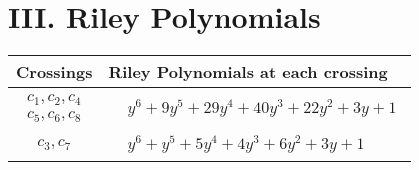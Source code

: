 \documentclass[1p]{elsarticle_modified}
\theoremstyle{definition}
\begin{document}
\centering \section*{ III. Riley Polynomials}
\begin{tabular}{m{50pt}|m{274pt}}
Crossings & \hspace{64pt}Riley Polynomials at each crossing \\
\hline $$\begin{aligned}c_{1},c_{2},c_{4}\\c_{5},c_{6},c_{8}\end{aligned}$$&$\begin{aligned}
&y^6+9 y^5+29 y^4+40 y^3+22 y^2+3 y+1
\end{aligned}$\\
\hline $$\begin{aligned}c_{3},c_{7}\end{aligned}$$&$\begin{aligned}
&y^6+y^5+5 y^4+4 y^3+6 y^2+3 y+1
\end{aligned}$\\
\hline
\end{tabular}
\vskip 2pc
\end{document}
